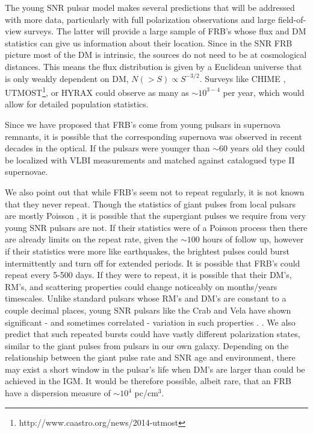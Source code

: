 \documentclass[useAMS,usenatbib]{mn2e}
\begin{document}
The young SNR pulsar model makes several predictions that will
be addressed with more data, particularly with full polarization 
observations and large field-of-view surveys. 
The latter will provide a large sample of FRB's whose flux and DM statistics
 can give us information about their location. Since in the SNR FRB picture
most of the DM is intrinsic, the sources do not need to be at cosmological 
distances. This means the flux distribution is given by a Euclidean universe
that is only weakly dependent on DM, $N(>S) \propto S^{-3/2}$. Surveys
like CHIME \citep{2014SPIE.9145E..22B}, 
UTMOST\footnote{http://www.caastro.org/news/2014-utmost},
 or HYRAX could observe as many as $\sim10^{3-4}$
per year, which would allow for detailed population statistics.

Since we have proposed that FRB's come from young pulsars 
in supernova remnants, it is possible that the corresponding 
supernova was observed in recent decades in the optical. If the pulsars
were younger than $\sim$60 years old they could be localized with VLBI
measurements and matched against catalogued type II supernovae. 

We also point out that while FRB's seem not to repeat regularly, 
it is not known that they never repeat. Though the statistics 
of giant pulses from local pulsars are mostly Poisson \citep{1999ApJ...517..460S},
it is possible that 
the supergiant pulses we require from very young SNR pulsars are not. If their 
statistics were of a Poisson process then there are already limits on the repeat rate, 
given the $\sim100$ hours of follow up, however if their statistics were more like
earthquakes, the brightest pulses could burst intermittently and turn off
for extended periods. It is possible that FRB's could repeat every 5-500 days. 
If they were to repeat,
it is possible that their DM's, RM's, and scattering properties could 
change noticeably on months/years timescales. Unlike standard pulsars 
whose RM's and DM's are constant to a couple decimal places, young 
SNR pulsars like the Crab and Vela have shown significant - and sometimes
correlated - variation in such properties \citep{1988A&A...202..166R, 2008A&A...483...13K}.
. We also predict that such repeated 
bursts could have vastly different polarization states, similar to the giant 
pulses from pulsars in our own galaxy. 
Depending on the relationship between the giant pulse rate and SNR
age and environment, there may exist a short window in the pulsar's life when 
DM's are larger than could be achieved in the IGM. It would be therefore 
possible, albeit rare, that an FRB have a dispersion
 measure of $\sim10^4$ pc/cm$^3$.
 
\end{document}
